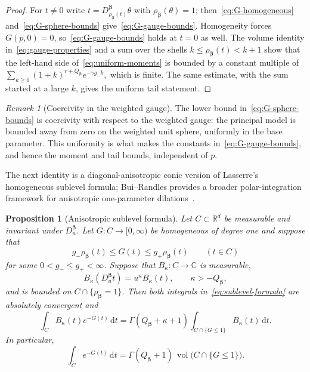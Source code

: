 \documentclass[11pt]{amsart}
\numberwithin{equation}{section}
\newtheorem{proposition}[theorem]{Proposition}
\theoremstyle{definition}
\theoremstyle{remark}
\newtheorem{remark}[theorem]{Remark}
\newcommand{\R}{\mathbb{R}}
\newcommand{\C}{\mathbb{C}}
\newcommand{\dd}{\,\mathrm{d}}
\newcommand{\vol}{\operatorname{vol}}
\begin{document}
\begin{proof}
For $t\ne0$ write $t=D_{\rho_{\bm\beta}(t)}^{\bm\beta}\theta$ with
$\rho_{\bm\beta}(\theta)=1$; then~\eqref{eq:G-homogeneous}
and~\eqref{eq:G-sphere-bounds} give~\eqref{eq:G-gauge-bounds}.  Homogeneity
forces $G(p,0)=0$, so~\eqref{eq:G-gauge-bounds} holds at $t=0$ as well.
The volume identity in~\eqref{eq:gauge-properties} and a
sum over the shells $k\le\rho_{\bm\beta}(t)<k+1$ show that the left-hand side
of~\eqref{eq:uniform-moments} is bounded by a constant multiple of
\(
  \sum_{k\ge0}(1+k)^{r+Q_{\bm\beta}}e^{-\gamma g_- k},
\)
which is finite.  The same estimate, with the sum started at a large $k$,
gives the uniform tail statement.
\end{proof}

\begin{remark}[Coercivity in the weighted gauge]
The lower bound in~\eqref{eq:G-sphere-bounds} is coercivity with respect to the
weighted gauge: the principal model is bounded away from zero on the weighted
unit sphere, uniformly in the base parameter.  This uniformity is what makes the
constants in~\eqref{eq:G-gauge-bounds}, and hence the moment and tail bounds,
independent of $p$.
\end{remark}

The next identity is a diagonal-anisotropic conic version of Lasserre's
homogeneous sublevel formula; Bui--Randles provides a broader polar-integration
framework for anisotropic one-parameter dilations~\cite{Lasserre,BuiRandles}.

\begin{proposition}[Anisotropic sublevel formula]\label{prop:sublevel-formula}
Let $C\subset\R^d$ be measurable and invariant under $D_u^{\bm\beta}$.
Let $G:C\to[0,\infty)$ be homogeneous of degree one and suppose that
\[
 g_-\rho_{\bm\beta}(t)\le G(t)\le g_+\rho_{\bm\beta}(t)\qquad(t\in C)
\]
for some $0<g_-\le g_+<\infty$.  Suppose that $B_\kappa:C\to\C$ is measurable,
\[
 B_\kappa(D_u^{\bm\beta}t)=u^\kappa B_\kappa(t),
 \qquad \kappa>-Q_{\bm\beta},
\]
and is bounded on $C\cap\{\rho_{\bm\beta}=1\}$.  Then both integrals in~\eqref{eq:sublevel-formula} are absolutely
convergent and
\begin{equation}\label{eq:sublevel-formula}
 \int_C B_\kappa(t)e^{-G(t)}\dd t
 =\Gamma(Q_{\bm\beta}+\kappa+1)
  \int_{C\cap\{G\le1\}}B_\kappa(t)\dd t.
\end{equation}
In particular,
\begin{equation}\label{eq:sublevel-volume}
 \int_C e^{-G(t)}\dd t
 =\Gamma(Q_{\bm\beta}+1)\,
  \vol\bigl(C\cap\{G\le1\}\bigr).
\end{equation}
\end{proposition}
\end{document}
